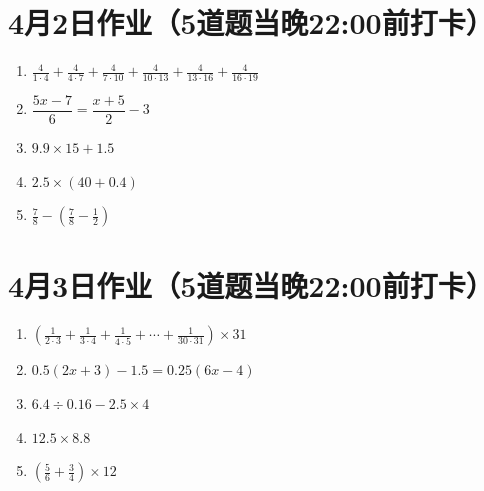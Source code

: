 \documentclass[UTF8,12pt,a4paper]{ctexart}
\newcommand{\BottomWriteSpace}{1.8cm}
\newenvironment{OnePageFiveFill}{
  \small
  \vspace*{0pt}
  \begin{enumerate}[leftmargin=*, itemsep=0pt, topsep=0pt, parsep=0pt, partopsep=0pt]
  \setlength{\parskip}{0pt}
}{
  \end{enumerate}
  \vspace*{\BottomWriteSpace}
  \normalsize
  \newpage
}
\newcommand{\Q}[1]{\item #1\par\vfill}
\newcommand{\Qlast}[1]{\item #1\par}
\begin{document}
\section*{4月2日作业（5道题当晚22:00前打卡）}
\begin{OnePageFiveFill}

\Q{$\displaystyle \frac{4}{1\cdot4}+\frac{4}{4\cdot7}+\frac{4}{7\cdot10}+\frac{4}{10\cdot13}+\frac{4}{13\cdot16}+\frac{4}{16\cdot19}$}

\Q{$\dfrac{5x-7}{6}=\dfrac{x+5}{2}-3$}

\Q{$9.9 \times 15 + 1.5$}

\Q{$2.5 \times (40 + 0.4)$}

\Qlast{$\displaystyle \frac{7}{8} - \left( \frac{7}{8} - \frac{1}{2} \right)$}

\end{OnePageFiveFill}

\section*{4月3日作业（5道题当晚22:00前打卡）}
\begin{OnePageFiveFill}

\Q{$\displaystyle \left(\frac{1}{2\cdot3}+\frac{1}{3\cdot4}+\frac{1}{4\cdot5}+\cdots+\frac{1}{30\cdot31}\right)\times 31$}

\Q{$0.5(2x+3)-1.5=0.25(6x-4)$}

\Q{$6.4 \div 0.16 - 2.5 \times 4$}

\Q{$12.5 \times 8.8$}

\Qlast{$\displaystyle \left( \frac{5}{6} + \frac{3}{4} \right) \times 12$}

\end{OnePageFiveFill}
\end{document}
